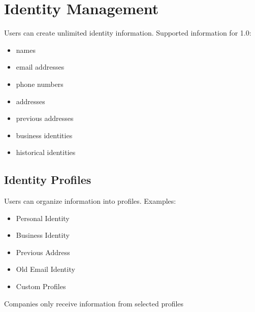 
\chapter{Identity Management}
Users can create unlimited identity information.
Supported information for 1.0:
\begin{itemize}
	\item names
	\item email addresses
	\item phone numbers
	\item addresses
	\item previous addresses
	\item business identities
	\item historical identities
\end{itemize}

\section{Identity Profiles}
Users can organize information into profiles.
Examples:

\begin{itemize}
	\item Personal Identity
	\item Business Identity
	\item Previous Address
	\item Old Email Identity
	\item Custom Profiles
\end{itemize}

Companies only receive information from selected profiles

\sentinelchapterend
